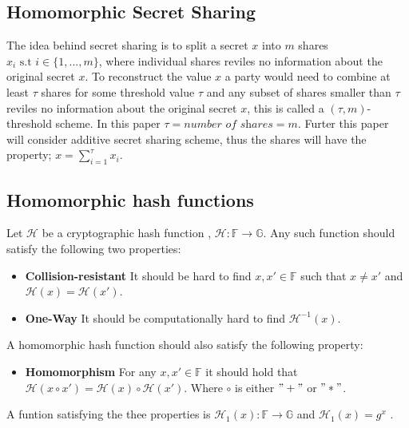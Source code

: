 \subsection*{Homomorphic Secret Sharing}
The idea behind secret sharing \cite{How_share_A_secret} is to split a secret $x$ into $m$ shares $x_i \text{ s.t } i\in\{1,...,m\}$, where individual shares reviles no information about the original secret $x$. To reconstruct the value $x$ a party would need to combine at least $\tau$ shares for some threshold value $\tau$ and any subset of shares smaller than $\tau$ reviles no information about the original secret $x$, this is called a $(\tau,m)$-threshold scheme. In this paper $\tau = \textit{number of shares}=m$. Furter this paper will consider additive secret sharing scheme, thus the shares will have the property; $x = \sum_{i=1}^\tau x_i$. 

\subsection*{Homomorphic hash functions}
Let $\mathcal{H}$ be a cryptographic hash function \cite{HHF}, $\mathcal{H}:\mathds{F}\to \mathds{G}$. Any such function should satisfy the following two properties:
\begin{itemize}
    \item \textbf{Collision-resistant} It should be hard to find $x,x'\in\mathds{F}$ such that $x\neq x'$ and $\mathcal{H}(x)=\mathcal{H}(x')$.
    \item \textbf{One-Way} It should be computationally hard to find $\mathcal{H}^{-1}(x)$.
\end{itemize}

A homomorphic hash function should also satisfy the following property:
\begin{itemize}
    \item \textbf{Homomorphism} For any $x,x'\in\mathds{F}$ it should hold that $\mathcal{H}(x\circ x') = \mathcal{H}(x)\circ\mathcal{H}(x')$. Where $\circ$ is either $"+"$ or $"*"$.
\end{itemize}

A funtion satisfying the thee properties is $\mathcal{H}_1(x):\mathds{F}\to\mathds{G}$ and $\mathcal{H}_1(x)= g^{x}$ \cite{HHF}. 

